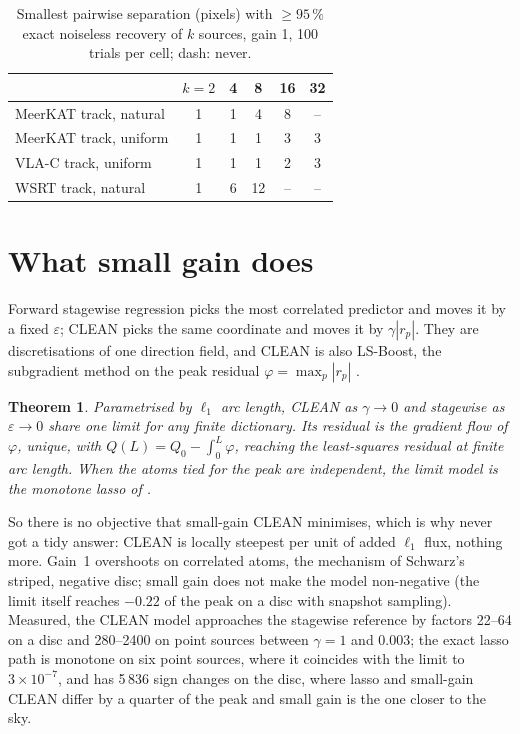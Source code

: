 \documentclass[twocolumn,10pt]{article}
\newtheorem{theorem}{Theorem}
\theoremstyle{remark}
\begin{document}
\begin{table}
\centering
\caption{Smallest pairwise separation (pixels) with $\ge95\,\%$ exact noiseless recovery of $k$ sources, gain 1, 100 trials per cell; dash: never.}
\label{tab:dstar}
\begin{tabular}{lccccc}
\toprule
 & $k{=}2$ & 4 & 8 & 16 & 32\\
\midrule
MeerKAT track, natural & 1 & 1 & 4 & 8 & --\\
MeerKAT track, uniform & 1 & 1 & 1 & 3 & 3\\
VLA-C track, uniform & 1 & 1 & 1 & 2 & 3\\
WSRT track, natural & 1 & 6 & 12 & -- & --\\
\bottomrule
\end{tabular}
\end{table}

\section{What small gain does}

Forward stagewise regression \citep{hastie07} picks the most correlated predictor and moves it by a fixed $\varepsilon$; CLEAN picks the same coordinate and moves it by $\gamma|r_p|$. They are discretisations of one direction field, and CLEAN is also LS-Boost, the subgradient method on the peak residual $\varphi=\max_p|r_p|$ \citep{freund17}.

\begin{theorem}
Parametrised by $\ell_1$ arc length, CLEAN as $\gamma\to0$ and stagewise as $\varepsilon\to0$ share one limit for any finite dictionary. Its residual is the gradient flow of $\varphi$, unique, with $Q(L)=Q_0-\int_0^L\varphi$, reaching the least-squares residual at finite arc length. When the atoms tied for the peak are independent, the limit model is the monotone lasso of \citet{hastie07}.
\end{theorem}

So there is no objective that small-gain CLEAN minimises, which is why \citet{marsh87} never got a tidy answer: CLEAN is locally steepest per unit of added $\ell_1$ flux, nothing more. Gain~1 overshoots on correlated atoms, the mechanism of Schwarz's striped, negative disc; small gain does not make the model non-negative (the limit itself reaches $-0.22$ of the peak on a disc with snapshot sampling). Measured, the CLEAN model approaches the stagewise reference by factors 22--64 on a disc and 280--2400 on point sources between $\gamma=1$ and $0.003$; the exact lasso path is monotone on six point sources, where it coincides with the limit to $3\times10^{-7}$, and has 5\,836 sign changes on the disc, where lasso and small-gain CLEAN differ by a quarter of the peak and small gain is the one closer to the sky.
\end{document}
